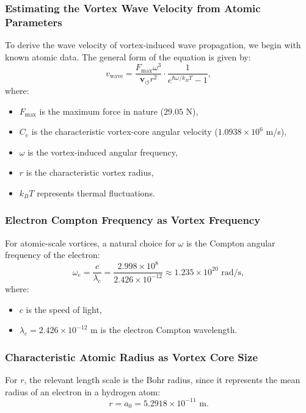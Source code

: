 \documentclass[a4paper,10pt]{article}
\begin{document}
    \subsubsection*{Estimating the Vortex Wave Velocity from Atomic Parameters}
    To derive the wave velocity of vortex-induced wave propagation, we begin with known atomic data. The general form of the equation is given by:
    \begin{equation*}
        v_\text{wave} = \frac{F_{\max} \omega^3}{\mathbf{v}_{\scriptscriptstyle\boldsymbol{\circlearrowleft}} r^2} \cdot \frac{1}{e^{\hbar \omega / k_B T} - 1},
    \end{equation*}
    where:
    \begin{itemize}
        \item $F_{\max}$ is the maximum force in nature ($29.05$ N),
        \item $C_e$ is the characteristic vortex-core angular velocity ($1.0938 \times 10^6$ m/s),
        \item $\omega$ is the vortex-induced angular frequency,
        \item $r$ is the characteristic vortex radius,
        \item $k_B T$ represents thermal fluctuations.
    \end{itemize}

    \subsubsection*{Electron Compton Frequency as Vortex Frequency}
    For atomic-scale vortices, a natural choice for $\omega$ is the Compton angular frequency of the electron:
    \begin{equation*}
        \omega_e = \frac{c}{\lambda_c} = \frac{2.998 \times 10^8}{2.426 \times 10^{-12}} \approx 1.235 \times 10^{20} \text{ rad/s},
    \end{equation*}
    where:
    \begin{itemize}
        \item $c$ is the speed of light,
        \item $\lambda_c = 2.426 \times 10^{-12}$ m is the electron Compton wavelength.
    \end{itemize}

    \subsubsection*{Characteristic Atomic Radius as Vortex Core Size}
    For $r$, the relevant length scale is the Bohr radius, since it represents the mean radius of an electron in a hydrogen atom:
    \begin{equation*}
        r = a_0 = 5.2918 \times 10^{-11} \text{ m}.
    \end{equation*}
\end{document}
